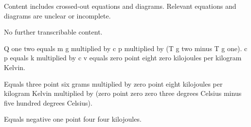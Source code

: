 Content includes crossed-out equations and diagrams. Relevant equations and diagrams are unclear or incomplete.  

No further transcribable content.

Q one two equals m g multiplied by c p multiplied by (T g two minus T g one).  
c p equals k multiplied by c v equals zero point eight zero kilojoules per kilogram Kelvin.  

Equals three point six grams multiplied by zero point eight kilojoules per kilogram Kelvin multiplied by (zero point zero zero three degrees Celsius minus five hundred degrees Celsius).  

Equals negative one point four four kilojoules.